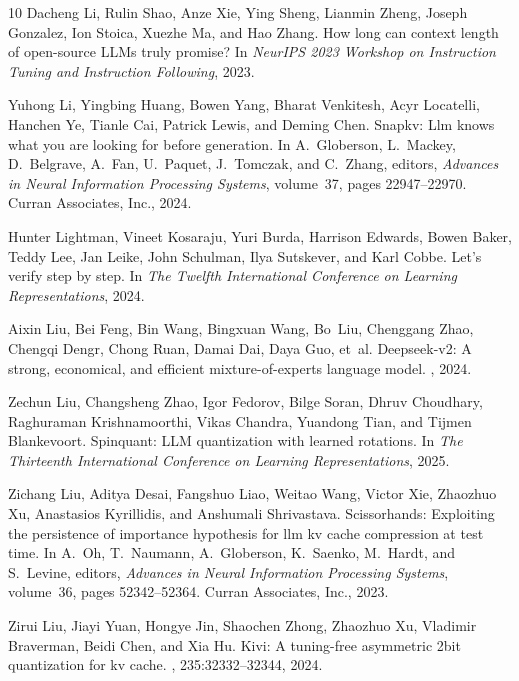\documentclass{llmxive}
\begin{document}
\begin{thebibliography}{10}
Dacheng Li, Rulin Shao, Anze Xie, Ying Sheng, Lianmin Zheng, Joseph Gonzalez, Ion Stoica, Xuezhe Ma, and Hao Zhang.
\newblock How long can context length of open-source {LLM}s truly promise?
\newblock In {\em NeurIPS 2023 Workshop on Instruction Tuning and Instruction Following}, 2023.

Yuhong Li, Yingbing Huang, Bowen Yang, Bharat Venkitesh, Acyr Locatelli, Hanchen Ye, Tianle Cai, Patrick Lewis, and Deming Chen.
\newblock Snapkv: Llm knows what you are looking for before generation.
\newblock In A.~Globerson, L.~Mackey, D.~Belgrave, A.~Fan, U.~Paquet, J.~Tomczak, and C.~Zhang, editors, {\em Advances in Neural Information Processing Systems}, volume~37, pages 22947--22970. Curran Associates, Inc., 2024.

Hunter Lightman, Vineet Kosaraju, Yuri Burda, Harrison Edwards, Bowen Baker, Teddy Lee, Jan Leike, John Schulman, Ilya Sutskever, and Karl Cobbe.
\newblock Let's verify step by step.
\newblock In {\em The Twelfth International Conference on Learning Representations}, 2024.

Aixin Liu, Bei Feng, Bin Wang, Bingxuan Wang, Bo~Liu, Chenggang Zhao, Chengqi Dengr, Chong Ruan, Damai Dai, Daya Guo, et~al.
\newblock Deepseek-v2: A strong, economical, and efficient mixture-of-experts language model.
, 2024.

Zechun Liu, Changsheng Zhao, Igor Fedorov, Bilge Soran, Dhruv Choudhary, Raghuraman Krishnamoorthi, Vikas Chandra, Yuandong Tian, and Tijmen Blankevoort.
\newblock Spinquant: {LLM} quantization with learned rotations.
\newblock In {\em The Thirteenth International Conference on Learning Representations}, 2025.

Zichang Liu, Aditya Desai, Fangshuo Liao, Weitao Wang, Victor Xie, Zhaozhuo Xu, Anastasios Kyrillidis, and Anshumali Shrivastava.
\newblock Scissorhands: Exploiting the persistence of importance hypothesis for llm kv cache compression at test time.
\newblock In A.~Oh, T.~Naumann, A.~Globerson, K.~Saenko, M.~Hardt, and S.~Levine, editors, {\em Advances in Neural Information Processing Systems}, volume~36, pages 52342--52364. Curran Associates, Inc., 2023.

Zirui Liu, Jiayi Yuan, Hongye Jin, Shaochen Zhong, Zhaozhuo Xu, Vladimir Braverman, Beidi Chen, and Xia Hu.
\newblock Kivi: A tuning-free asymmetric 2bit quantization for kv cache.
, 235:32332--32344, 2024.


\end{thebibliography}
\end{document}
